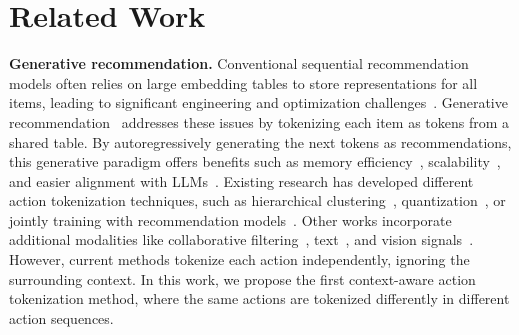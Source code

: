 \section{Related Work}

\textbf{Generative recommendation.} Conventional sequential recommendation models 
often relies on large embedding tables to store representations for all items, leading to significant engineering and optimization challenges~\cite{hidasi2016gru4rec,kang2018sasrec}.
Generative recommendation~\cite{deldjoo2024review,rajput2023tiger,zheng2024lcrec} addresses these issues by tokenizing each item as tokens from a shared table. 
By autoregressively generating the next tokens as recommendations, this generative paradigm offers benefits such as memory efficiency~\cite{rajput2023tiger,yang2024liger,ding2024specgr}, scalability~\cite{zhai2024hstu,liu2024mbgen}, and easier alignment with LLMs~\cite{zheng2024lcrec,jin2024lmindexer,tan2024idgenrec,li2025semantic}.
Existing research has developed different action tokenization techniques, such as hierarchical clustering~\cite{hua2023p5cid,si2024seater}, quantization~\cite{rajput2023tiger,wang2024letter,zhu2024cost}, or jointly training with recommendation models~\cite{liu2024etegrec}. Other works incorporate additional modalities like collaborative filtering~\cite{petrov2023gptrec,wang2024eager,wang2024colarec,liu2024mbgen}, text~\cite{zheng2024lcrec,jin2024lmindexer,hou2024llmrank,zhang2025instructrec}, and vision signals~\cite{liu2024mmgrec}. However, current methods tokenize each action independently, ignoring the surrounding context.
In this work, we propose the first context-aware action tokenization method, where the same actions are tokenized differently in different action sequences.

